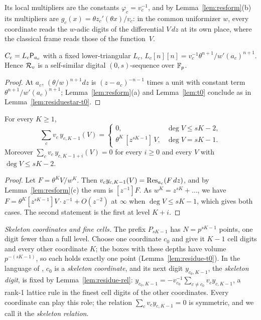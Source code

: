 Its local multipliers are the constants $\varphi_c=v_c^{-1}$, and by Lemma~\ref{lem:resform}(b) its multipliers are $g_c(x)=\theta z_c'(\theta x)/v_c$: in the common uniformizer $w$, every coordinate reads the $w$-adic digits of the differential $V\,dz$ at its own place, where the classical frame reads those of the function~$V$.

\begin{lemma}[Residue sequences have $t=0$]\label{lem:residue-t0}
$C_c=L_c\mathsf{P}_{a_c}$ with a fixed lower-triangular $L_c$, $L_c[n][n]=v_c^{-1}\theta^{n+1}/w'(a_c)^{n+1}$. Hence $\mathcal{R}_v$ is a self-similar digital $(0,s)$-sequence over $\mathbb{F}_p$.
\end{lemma}

\begin{proof}
At $a_c$, $(\theta/w)^{n+1}dz$ is $(z-a_c)^{-n-1}$ times a unit with constant term $\theta^{n+1}/w'(a_c)^{n+1}$; Lemma~\ref{lem:resform}(a) and Lemma~\ref{lem:t0} conclude as in Lemma~\ref{lem:residuestar-t0}.
\end{proof}

\begin{lemma}\label{lem:residue-rel}
For every $K\ge1$,
\[
\sum_cv_c\,y_{c,K-1}(V)=\begin{cases}0,&\deg V\le sK-2,\\ \theta^K\,[z^{sK-1}]\,V,&\deg V=sK-1.\end{cases}
\]
Moreover $\sum_cv_c\,y_{c,K-1+i}(V)=0$ for every $i\ge0$ and every $V$ with $\deg V\le sK-2$.
\end{lemma}

\begin{proof}
Let $F=\theta^KV/w^K$. Then $v_cy_{c,K-1}(V)=\operatorname{Res}_{a_c}(F\,dz)$, and by Lemma~\ref{lem:resform}(c) the sum is $[z^{-1}]F$. As $w^K=z^{sK}+\dots$, we have $F=\theta^K[z^{sK-1}]V\cdot z^{-1}+O(z^{-2})$ at $\infty$ when $\deg V\le sK-1$, which gives both cases. The second statement is the first at level $K+i$.
\end{proof}

\emph{Skeleton coordinates and fine cells.} The prefix $P_{sK-1}$ has $N=p^{sK-1}$ points, one digit fewer than a full level. Choose one coordinate $c_0$ and give it $K-1$ cell digits and every other coordinate $K$; the boxes with these depths have volume $p^{-(sK-1)}$, so each holds exactly one point (Lemma~\ref{lem:residue-t0}). In the language of \cite{Gru26geo}, $c_0$ is a \emph{skeleton coordinate}, and its next digit $y_{c_0,K-1}$, the \emph{skeleton digit}, is fixed by Lemma~\ref{lem:residue-rel}: $y_{c_0,K-1}=-v_{c_0}^{-1}\sum_{c\ne c_0}v_cy_{c,K-1}$, a rank-1 lattice rule in the finest cell digits of the other coordinates. Every coordinate can play this role; the relation $\sum_cv_cy_{c,K-1}=0$ is symmetric, and we call it the \emph{skeleton relation}.

